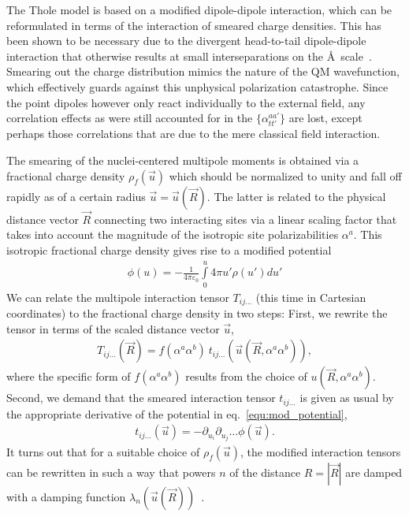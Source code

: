 The Thole model is based on a modified dipole-dipole interaction, which can be 
reformulated in terms of the interaction of smeared charge densities. This has 
been shown to be necessary due to the divergent head-to-tail dipole-dipole 
interaction that otherwise results at small interseparations on the 
\AA~scale~\cite{applequist_atom_1972, thole_molecular_1981, 
van_duijnen_molecular_1998}. Smearing out the charge distribution mimics the 
nature of the QM wavefunction, which effectively guards against this unphysical 
polarization catastrophe. Since the point dipoles however only react 
individually to the external field, any correlation effects as were still 
accounted for in the $\{\alpha_{tt'}^{aa'}\}$ are lost, except perhaps those 
correlations that are due to the mere classical field interaction.

The smearing of the nuclei-centered multipole moments is obtained via a 
fractional charge density $\rho_f(\vec{u})$ which should be normalized to unity 
and fall off rapidly as of a certain radius $\vec{u} = \vec{u}(\vec{R})$. The 
latter is related to the physical distance vector $\vec{R}$ connecting two 
interacting sites via a linear scaling factor that takes into account the 
magnitude of the isotropic site polarizabilities $\alpha^a$. This isotropic 
fractional charge density gives rise to a modified potential
\begin{align}
 \phi(u) = -\frac{1}{4\pi\varepsilon_0} \int \limits_{0}^{u} \! 4\pi u' \rho(u') 
d\!u' 
 \label{equ:mod_potential}
\end{align}
We can relate the multipole interaction tensor $T_{ij \dots}$ (this time in 
Cartesian coordinates) to the fractional charge density in two steps: First, we 
rewrite the tensor in terms of the scaled distance vector $\vec{u}$,
\begin{align}
 T_{ij \dots }(\vec{R}) = f(\alpha^a \alpha^b) \ t_{ij 
\dots}(\vec{u}(\vec{R},\alpha^a \alpha^b)),
\end{align}
where the specific form of $f(\alpha^a \alpha^b)$ results from the choice of 
$u(\vec{R},\alpha^a \alpha^b)$. Second, we demand that the smeared interaction 
tensor $t_{ij \dots}$ is given as usual by the appropriate derivative of the 
potential in eq.~\ref{equ:mod_potential},
\begin{align}
 t_{ij \dots}(\vec{u}) = - \partial_{u_i} \partial_{u_j} \dots \phi(\vec{u}).
\end{align}
It turns out that for a suitable choice of $\rho_f(\vec{u})$, the modified 
interaction tensors can be rewritten in such a way that powers $n$ of the 
distance $R = |\vec{R}|$ are damped with a damping function 
$\lambda_n(\vec{u}(\vec{R}))$~\cite{ren_polarizable_2003}.


